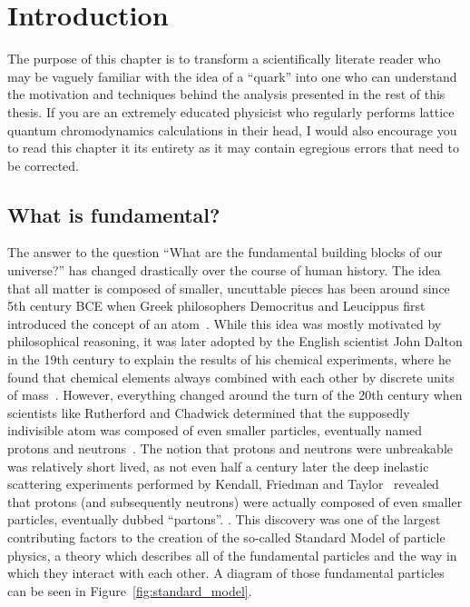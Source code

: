 \chapter{Introduction}

The purpose of this chapter is to transform a scientifically literate reader who may be vaguely familiar with the idea of a ``quark'' into one who can understand the motivation and techniques behind the analysis presented in the rest of this thesis. 
If you are an extremely educated physicist who regularly performs lattice quantum chromodynamics calculations in their head, I would also encourage you to read this chapter it its entirety as it may contain egregious errors that need to be corrected. 

\section{What is fundamental?}
The answer to the question ``What are the fundamental building blocks of our universe?'' has changed drastically over the course of human history.
The idea that all matter is composed of smaller, uncuttable pieces has been around since 5th century BCE when Greek philosophers Democritus and Leucippus first introduced the concept of an atom~\cite{GreekAtom}. While this idea was mostly motivated by philosophical reasoning, it was later adopted by the English scientist John Dalton in the 19th century to explain the results of his chemical experiments, where he found that chemical elements always combined with each other by discrete units of mass~\cite{Dalton}. However, everything changed around the turn of the 20th century when scientists like Rutherford and Chadwick determined that the supposedly indivisible atom was composed of even smaller particles, eventually named protons and neutrons~\cite{Protons, Neutrons}.
The notion that protons and neutrons were unbreakable was relatively short lived, as not even half a century later the deep inelastic scattering experiments performed by Kendall, Friedman and Taylor~\cite{Kendall, Friedman, Taylor} revealed that protons (and subsequently neutrons) were actually composed of even smaller particles, eventually dubbed ``partons''. \cite{Partons}.
This discovery was one of the largest contributing factors to the creation of the so-called Standard Model of particle physics, a theory which describes all of the fundamental particles and the way in which they interact with each other. A diagram of those fundamental particles can be seen in Figure~\ref{fig:standard_model}.
